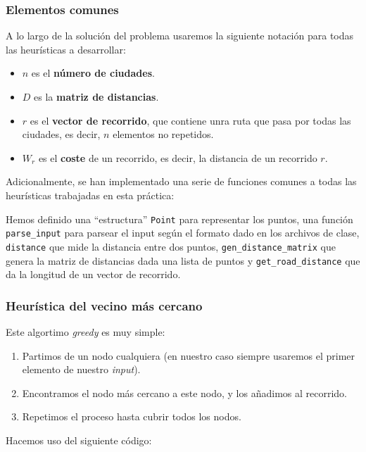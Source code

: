 \documentclass[10pt,a4paper]{article}
\begin{document}
\subsubsection*{Elementos comunes}
A lo largo de la solución del problema usaremos la siguiente notación para todas las heurísticas a desarrollar:
\begin{itemize}
	\item \(n\) es el \textbf{número de ciudades}.
	\item \(D\) es la \textbf{matriz de distancias}.
	\item \(r\) es el \textbf{vector de recorrido}, que contiene unra ruta que pasa por todas las ciudades, es decir, \(n\) elementos no repetidos.
	\item \(W_r\) es el \textbf{coste} de un recorrido, es decir, la distancia de un recorrido \(r\).
\end{itemize}

Adicionalmente, se han implementado una serie de funciones comunes a todas las heurísticas trabajadas en esta práctica:



Hemos definido una ``estructura'' \texttt{Point} para representar los puntos, una función \texttt{parse\_input} para parsear el input según el formato dado en los archivos de clase, \texttt{distance} que mide la distancia entre dos puntos, \texttt{gen\_distance\_matrix} que genera la matriz de distancias dada una lista de puntos y \texttt{get\_road\_distance} que da la longitud de un vector de recorrido.

\subsubsection{Heurística del vecino más cercano}

Este algortimo \textit{greedy} es muy simple:
\begin{enumerate}
	\item Partimos de un nodo cualquiera (en nuestro caso siempre usaremos el primer elemento de nuestro \textit{input}).
	\item Encontramos el nodo más cercano a este nodo, y los añadimos al recorrido.
	\item Repetimos el proceso hasta cubrir todos los nodos.
\end{enumerate}

Hacemos uso del siguiente código:

\end{document}
